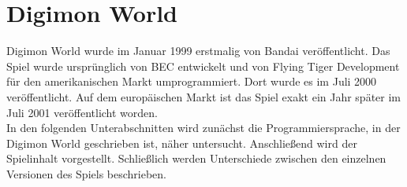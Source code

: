 \section{Digimon World}\label{sec:dw1}
Digimon World wurde im Januar 1999 erstmalig von Bandai veröffentlicht\cite{mobygames}.
Das Spiel wurde ursprünglich von BEC entwickelt und von Flying Tiger Development für den amerikanischen Markt umprogrammiert\cite{lineup}\cite{flyingtiger}.
Dort wurde es im Juli 2000 veröffentlicht.
Auf dem europäischen Markt ist das Spiel exakt ein Jahr später im Juli 2001 veröffentlicht worden.\\

In den folgenden Unterabschnitten wird zunächst die Programmiersprache, in der Digimon World geschrieben ist, näher untersucht.
Anschließend wird der Spielinhalt vorgestellt.
Schließlich werden Unterschiede zwischen den einzelnen Versionen des Spiels beschrieben.\\


